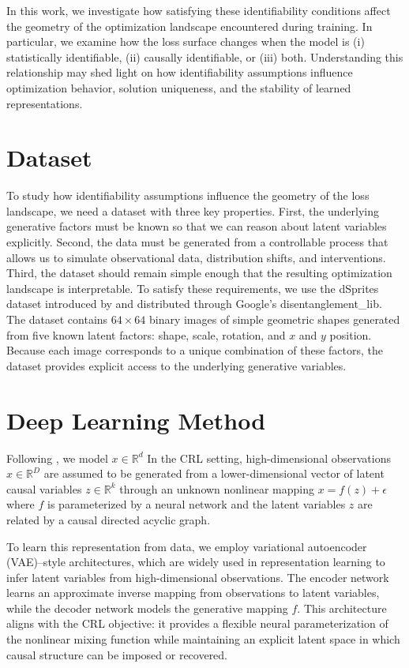 \documentclass{article} %
\begin{document}
In this work, we investigate how satisfying these identifiability conditions affect the geometry of the optimization landscape encountered during training. In particular, we examine how the loss surface changes when the model is (i) statistically identifiable, (ii) causally identifiable, or (iii) both. Understanding this relationship may shed light on how identifiability assumptions influence optimization behavior, solution uniqueness, and the stability of learned representations.

\section{Dataset}

To study how identifiability assumptions influence the geometry of the loss landscape, we need a dataset with three key properties. First, the underlying generative factors must be known so that we can reason about latent variables explicitly. Second, the data must be generated from a controllable process that allows us to simulate observational data, distribution shifts, and interventions. Third, the dataset should remain simple enough that the resulting optimization landscape is interpretable. To satisfy these requirements, we use the dSprites dataset introduced by \cite{Higgins2017BetaVAE} and distributed through Google’s disentanglement\_lib. The dataset contains $64 \times 64$ binary images of simple geometric shapes generated from five known latent factors: shape, scale, rotation, and $x$ and $y$ position. Because each image corresponds to a unique combination of these factors, the dataset provides explicit access to the underlying generative variables.

\section{Deep Learning Method}

Following \citet{Moran2026CRLFramework}, we model $x \in \mathbb{R}^d$ In the CRL setting, high-dimensional observations $x \in \mathbb{R}^D$ are assumed to be generated from a lower-dimensional vector of latent causal variables $z \in \mathbb{R}^k$ through an unknown nonlinear mapping $x = f(z) + \epsilon$ where $f$ is parameterized by a neural network and the latent variables $z$ are related by a causal directed acyclic graph.

To learn this representation from data, we employ variational autoencoder (VAE)–style architectures, which are widely used in representation learning to infer latent variables from high-dimensional observations. The encoder network learns an approximate inverse mapping from observations to latent variables, while the decoder network models the generative mapping $f$. This architecture aligns with the CRL objective: it provides a flexible neural parameterization of the nonlinear mixing function while maintaining an explicit latent space in which causal structure can be imposed or recovered.
\end{document}
